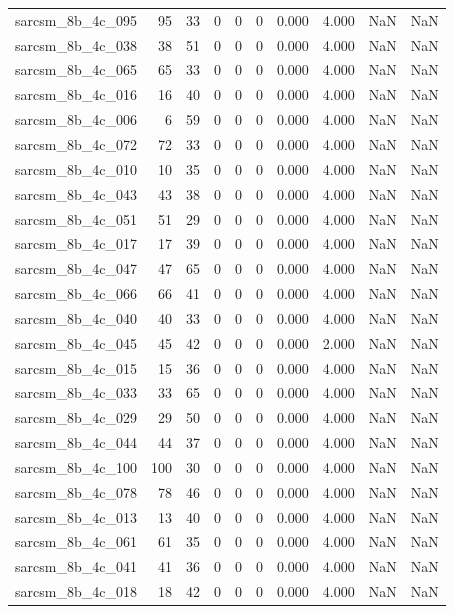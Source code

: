 \documentclass{article}
\begin{document}
\begin{longtable}{lrrrrrrrrr}
sarcsm\_8b\_4c\_095 & 95 & 33 & 0 & 0 & 0 & 0.000 & 4.000 & NaN & NaN \\
sarcsm\_8b\_4c\_038 & 38 & 51 & 0 & 0 & 0 & 0.000 & 4.000 & NaN & NaN \\
sarcsm\_8b\_4c\_065 & 65 & 33 & 0 & 0 & 0 & 0.000 & 4.000 & NaN & NaN \\
sarcsm\_8b\_4c\_016 & 16 & 40 & 0 & 0 & 0 & 0.000 & 4.000 & NaN & NaN \\
sarcsm\_8b\_4c\_006 & 6 & 59 & 0 & 0 & 0 & 0.000 & 4.000 & NaN & NaN \\
sarcsm\_8b\_4c\_072 & 72 & 33 & 0 & 0 & 0 & 0.000 & 4.000 & NaN & NaN \\
sarcsm\_8b\_4c\_010 & 10 & 35 & 0 & 0 & 0 & 0.000 & 4.000 & NaN & NaN \\
sarcsm\_8b\_4c\_043 & 43 & 38 & 0 & 0 & 0 & 0.000 & 4.000 & NaN & NaN \\
sarcsm\_8b\_4c\_051 & 51 & 29 & 0 & 0 & 0 & 0.000 & 4.000 & NaN & NaN \\
sarcsm\_8b\_4c\_017 & 17 & 39 & 0 & 0 & 0 & 0.000 & 4.000 & NaN & NaN \\
sarcsm\_8b\_4c\_047 & 47 & 65 & 0 & 0 & 0 & 0.000 & 4.000 & NaN & NaN \\
sarcsm\_8b\_4c\_066 & 66 & 41 & 0 & 0 & 0 & 0.000 & 4.000 & NaN & NaN \\
sarcsm\_8b\_4c\_040 & 40 & 33 & 0 & 0 & 0 & 0.000 & 4.000 & NaN & NaN \\
sarcsm\_8b\_4c\_045 & 45 & 42 & 0 & 0 & 0 & 0.000 & 2.000 & NaN & NaN \\
sarcsm\_8b\_4c\_015 & 15 & 36 & 0 & 0 & 0 & 0.000 & 4.000 & NaN & NaN \\
sarcsm\_8b\_4c\_033 & 33 & 65 & 0 & 0 & 0 & 0.000 & 4.000 & NaN & NaN \\
sarcsm\_8b\_4c\_029 & 29 & 50 & 0 & 0 & 0 & 0.000 & 4.000 & NaN & NaN \\
sarcsm\_8b\_4c\_044 & 44 & 37 & 0 & 0 & 0 & 0.000 & 4.000 & NaN & NaN \\
sarcsm\_8b\_4c\_100 & 100 & 30 & 0 & 0 & 0 & 0.000 & 4.000 & NaN & NaN \\
sarcsm\_8b\_4c\_078 & 78 & 46 & 0 & 0 & 0 & 0.000 & 4.000 & NaN & NaN \\
sarcsm\_8b\_4c\_013 & 13 & 40 & 0 & 0 & 0 & 0.000 & 4.000 & NaN & NaN \\
sarcsm\_8b\_4c\_061 & 61 & 35 & 0 & 0 & 0 & 0.000 & 4.000 & NaN & NaN \\
sarcsm\_8b\_4c\_041 & 41 & 36 & 0 & 0 & 0 & 0.000 & 4.000 & NaN & NaN \\
sarcsm\_8b\_4c\_018 & 18 & 42 & 0 & 0 & 0 & 0.000 & 4.000 & NaN & NaN \\

\end{longtable}
\end{document}
